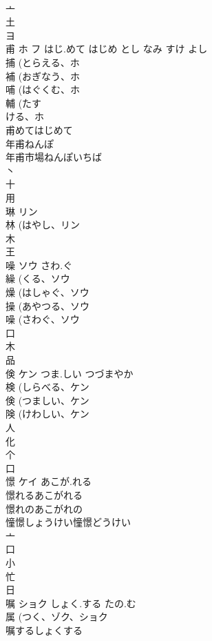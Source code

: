 \documentclass[8pt]{extreport}
\begin{document}
\begin{CJK}{UTF8}{min}
\\	亠 
\\	土 
\\	ヨ	
\\	甫	ホ フ	はじ.めて はじめ とし なみ すけ よし	
\\	捕 (とらえる、ホ 
\\	補 (おぎなう、ホ 
\\	哺 (はぐくむ、ホ 
\\	輔 (たす
\\	ける、ホ 
\\	甫めてはじめて 
\\	年甫ねんぽ 
\\	年甫市場ねんぽいちば 
\\	丶 
\\	十 
\\	用 
\\	琳	リン		
\\	林 (はやし、リン 
\\	木 
\\	王 
\\	噪	ソウ	さわ.ぐ	
\\	繰 (くる、ソウ 
\\	燥 (はしゃぐ、ソウ 
\\	操 (あやつる、ソウ 
\\	噪 (さわぐ、ソウ 
\\	口 
\\	木 
\\	品 
\\	倹	ケン	つま.しい つづまやか	
\\	検 (しらべる、ケン 
\\	倹 (つましい、ケン 
\\	険 (けわしい、ケン 
\\	人 
\\	化 
\\	个 
\\	口 
\\	憬	ケイ	あこが.れる	
\\	憬れるあこがれる
\\	憬れのあこがれの
\\	憧憬しょうけい憧憬どうけい
\\	亠 
\\	口 
\\	小 
\\	忙 
\\	日 
\\	嘱	ショク	しょく.する たの.む	
\\	属 (つく、ゾク、ショク 
\\	嘱するしょくする

\end{CJK}
\end{document}
